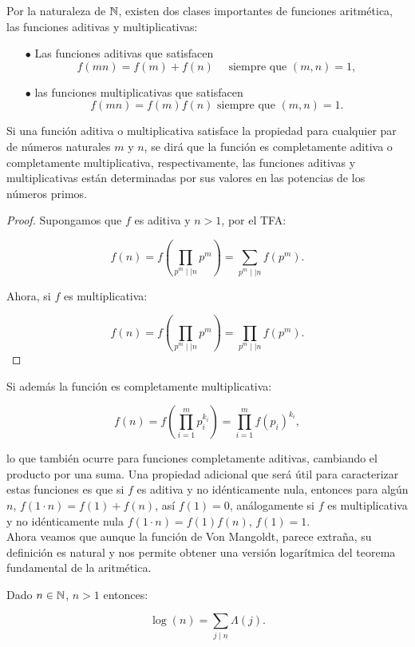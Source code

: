 Por la naturaleza de $\mathbb{N}$, existen dos clases importantes de funciones aritmética, las funciones aditivas y multiplicativas:

\begin{itemize}

\item[$\bullet$] Las funciones aditivas que satisfacen
$$
f(m n)=f(m)+f(n) \quad \text { siempre que }(m, n)=1,
$$


\item[$\bullet$] las funciones multiplicativas que satisfacen
$$
f(m n)=f(m) f(n) \text { siempre que }(m, n)=1 .
$$


\end{itemize}


Si una función aditiva o multiplicativa satisface la  propiedad para cualquier par de números naturales $m$ y $n$, se dirá que la función es completamente aditiva o completamente multiplicativa, respectivamente, las funciones aditivas y multiplicativas están determinadas por sus valores en las potencias de los números primos.\\ 

\begin{proof}
Supongamos que $f$ es aditiva y $n>1$, por el TFA:

$$f(n)=f\left(\prod_{p^m\mid\mid n}p^m\right)=\sum_{p^m\mid \mid n} f(p^{m}).$$

Ahora, si $f$ es multiplicativa:

$$f(n)=f\left(\prod_{p^m\mid\mid n}p^m\right)=\prod_{p^m\mid\mid n}f(p^m).$$
\end{proof}

Si además la función es completamente multiplicativa:

$$f(n)=f\left(\prod_{i=1}^{m}p_i^{k_i}\right)=\prod_{i=1}^{m} f(p_i)^{k_i},$$

lo que también ocurre para funciones completamente aditivas, cambiando el producto por una suma.  Una propiedad adicional que será útil para caracterizar estas funciones es que si $f$ es aditiva y no idénticamente nula, entonces para algún $n$, $f(1\cdot  n)=f(1)+f(n)$, así $f(1)=0$, análogamente si $f$ es multiplicativa y no idénticamente nula $f(1\cdot n)=f(1)f(n)$, $f(1)=1$.\\

Ahora veamos que aunque la función de Von Mangoldt, parece extraña, su definición es natural y nos permite obtener una versión logarítmica del teorema fundamental de la aritmética.

\begin{theorem}
Dado $n\in \mathbb{N}$, $n>1$ entonces:

$$\log(n)=\sum_{j\mid n}\Lambda(j).$$
\end{theorem}

